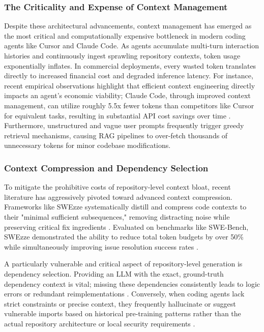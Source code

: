 \documentclass[11pt,a4paper,twocolumn]{article}
\begin{document}
\subsubsection*{The Criticality and Expense of Context Management}

Despite these architectural advancements, context management has emerged as the most critical and computationally expensive bottleneck in modern coding agents like Cursor and Claude Code. As agents accumulate multi-turn interaction histories and continuously ingest sprawling repository contexts, token usage exponentially inflates. In commercial deployments, every wasted token translates directly to increased financial cost and degraded inference latency. For instance, recent empirical observations highlight that efficient context engineering directly impacts an agent's economic viability; Claude Code, through improved context management, can utilize roughly 5.5x fewer tokens than competitors like Cursor for equivalent tasks, resulting in substantial API cost savings over time \cite{morphllm2026context}. Furthermore, unstructured and vague user prompts frequently trigger greedy retrieval mechanisms, causing RAG pipelines to over-fetch thousands of unnecessary tokens for minor codebase modifications.

\subsubsection*{Context Compression and Dependency Selection}

To mitigate the prohibitive costs of repository-level context bloat, recent literature has aggressively pivoted toward advanced context compression. Frameworks like SWEzze systematically distill and compress code contexts to their "minimal sufficient subsequences," removing distracting noise while preserving critical fix ingredients \cite{mechtaev2026compressing}. Evaluated on benchmarks like SWE-Bench, SWEzze demonstrated the ability to reduce total token budgets by over 50\% while simultaneously improving issue resolution success rates \cite{mechtaev2026compressing}.

A particularly vulnerable and critical aspect of repository-level generation is dependency selection. Providing an LLM with the exact, ground-truth dependency context is vital; missing these dependencies consistently leads to logic errors or redundant reimplementations \cite{lehai2026repository}. Conversely, when coding agents lack strict constraints or precise context, they frequently hallucinate or suggest vulnerable imports based on historical pre-training patterns rather than the actual repository architecture or local security requirements \cite{blackduck2026ossra}.
\end{document}
